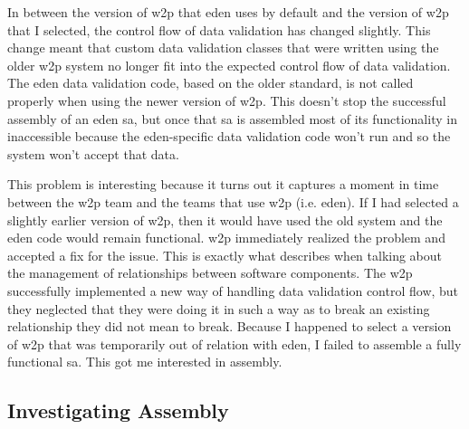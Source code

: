 \documentclass[a4paper,man,natbib]{apa6}
\begin{document}
   In between the version of \gls{w2p} that \acrshort{eden} uses by default and the version of \gls{w2p} that I selected, the control flow of data validation has changed slightly. This change meant that custom data validation classes that were written using the older \gls{w2p} system no longer fit into the expected control flow of data validation. The \acrshort{eden} data validation code, based on the older standard, is not called properly when using the newer version of \gls{w2p}. This doesn't stop the successful assembly of an \acrshort{eden} \gls{sa}, but once that \gls{sa} is assembled most of its functionality in inaccessible because the \acrshort{eden}-specific data validation code won't run and so the system won't accept that data. 

   This problem is interesting because it turns out it captures a moment in time between the \gls{w2p} team and the teams that use \gls{w2p} (i.e. \acrshort{eden}). If I had selected a slightly earlier version of \gls{w2p}, then it would have used the old system and the \acrshort{eden} code would remain functional. \gls{w2p} immediately realized the problem and accepted a fix for the issue. This is exactly what \citet{Mackenzie2006-hb} describes when talking about the management of relationships between software components. The \gls{w2p} successfully implemented a new way of handling data validation control flow, but they neglected that they were doing it in such a way as to break an existing relationship they did not mean to break. Because I happened to select a version of \gls{w2p} that was temporarily out of relation with \acrshort{eden}, I failed to assemble a fully functional \gls{sa}. This got me interested in assembly.

   
   \subsection*{Investigating Assembly}


   

   
  
   \printnoidxglossaries
   \setlength{\parindent}{4em}
   
\end{document}
